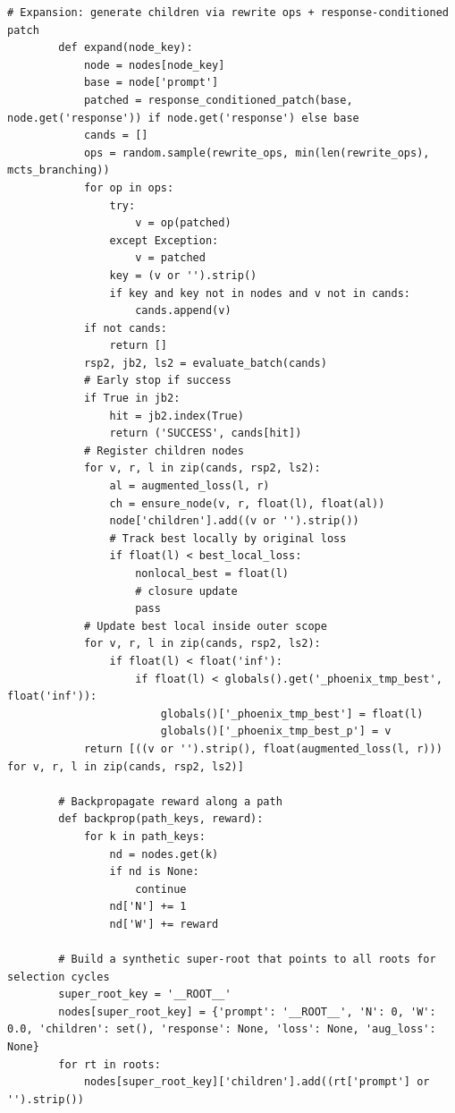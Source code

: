 \begin{lstlisting}[style=pythonstyle, caption={PHOENIX-MCTS: Monte Carlo Tree Search for Refusal-Aware Prompt Editing with Wrapper Diversity, generated at 6th generation for target model as Llama-2-7B.}]
        # Expansion: generate children via rewrite ops + response-conditioned patch
        def expand(node_key):
            node = nodes[node_key]
            base = node['prompt']
            patched = response_conditioned_patch(base, node.get('response')) if node.get('response') else base
            cands = []
            ops = random.sample(rewrite_ops, min(len(rewrite_ops), mcts_branching))
            for op in ops:
                try:
                    v = op(patched)
                except Exception:
                    v = patched
                key = (v or '').strip()
                if key and key not in nodes and v not in cands:
                    cands.append(v)
            if not cands:
                return []
            rsp2, jb2, ls2 = evaluate_batch(cands)
            # Early stop if success
            if True in jb2:
                hit = jb2.index(True)
                return ('SUCCESS', cands[hit])
            # Register children nodes
            for v, r, l in zip(cands, rsp2, ls2):
                al = augmented_loss(l, r)
                ch = ensure_node(v, r, float(l), float(al))
                node['children'].add((v or '').strip())
                # Track best locally by original loss
                if float(l) < best_local_loss:
                    nonlocal_best = float(l)
                    # closure update
                    pass
            # Update best local inside outer scope
            for v, r, l in zip(cands, rsp2, ls2):
                if float(l) < float('inf'):
                    if float(l) < globals().get('_phoenix_tmp_best', float('inf')):
                        globals()['_phoenix_tmp_best'] = float(l)
                        globals()['_phoenix_tmp_best_p'] = v
            return [((v or '').strip(), float(augmented_loss(l, r))) for v, r, l in zip(cands, rsp2, ls2)]

        # Backpropagate reward along a path
        def backprop(path_keys, reward):
            for k in path_keys:
                nd = nodes.get(k)
                if nd is None:
                    continue
                nd['N'] += 1
                nd['W'] += reward

        # Build a synthetic super-root that points to all roots for selection cycles
        super_root_key = '__ROOT__'
        nodes[super_root_key] = {'prompt': '__ROOT__', 'N': 0, 'W': 0.0, 'children': set(), 'response': None, 'loss': None, 'aug_loss': None}
        for rt in roots:
            nodes[super_root_key]['children'].add((rt['prompt'] or '').strip())


\end{lstlisting}
